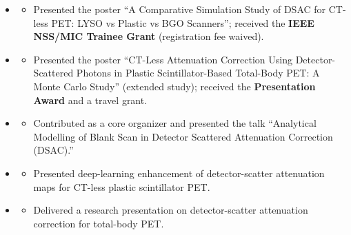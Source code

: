 \noindent {}
\begin{itemize}


\item {}
    \begin{itemize}
        \item Presented the poster ``A Comparative Simulation Study of DSAC for CT-less PET: LYSO vs Plastic vs BGO Scanners''; received the \textbf{IEEE NSS/MIC Trainee Grant} (registration fee waived).
    \end{itemize}

\item {}
    \begin{itemize}
        \item Presented the poster ``CT-Less Attenuation Correction Using Detector-Scattered Photons in Plastic Scintillator-Based Total-Body PET: A Monte Carlo Study'' (extended study); received the \textbf{Presentation Award} and a travel grant.
    \end{itemize}

\item {}
    \begin{itemize}
        \item Contributed as a core organizer and presented the talk ``Analytical Modelling of Blank Scan in Detector Scattered Attenuation Correction (DSAC).''
    \end{itemize}

\item {}
    \begin{itemize}
        \item Presented deep-learning enhancement of detector-scatter attenuation maps for CT-less plastic scintillator PET.
    \end{itemize}

\item {}
    \begin{itemize}
        \item Delivered a research presentation on detector-scatter attenuation correction for total-body PET.
    \end{itemize}


\end{itemize}
